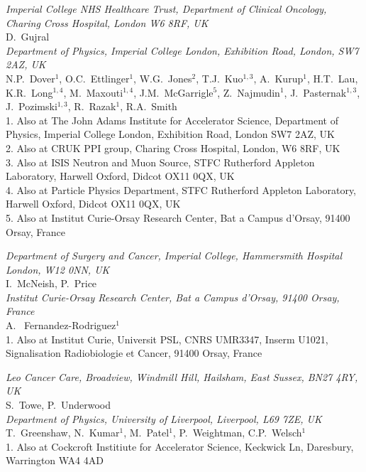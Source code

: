 \noindent \textit{Imperial College NHS Healthcare Trust, Department of Clinical Oncology, Charing Cross Hospital, London W6 8RF, UK} \\
D.~Gujral \\
 
\noindent \textit{Department of Physics, Imperial College London, Exhibition Road, London, SW7 2AZ, UK} \\
N.P.~Dover$^{1}$, O.C.~Ettlinger$^{1}$, W.G.~Jones$^{2}$, T.J.~Kuo$^{1, 3}$, A.~Kurup$^{1}$, H.T.~Lau, K.R.~Long$^{1, 4}$, M.~Maxouti$^{1, 4}$, J.M.~McGarrigle$^{5}$, Z.~Najmudin$^{1}$, J.~Pasternak$^{1, 3}$, J.~Pozimski$^{1, 3}$, R.~Razak$^{1}$, R.A.~Smith \\
{\footnotesize
  1. Also at The John Adams Institute for Accelerator Science, Department of Physics, Imperial College London, Exhibition Road, London SW7 2AZ, UK \\
  2. Also at CRUK PPI group, Charing Cross Hospital, London, W6 8RF, UK \\
  3. Also at ISIS Neutron and Muon Source, STFC Rutherford Appleton Laboratory, Harwell Oxford, Didcot OX11 0QX, UK \\
  4. Also at Particle Physics Department, STFC Rutherford Appleton Laboratory, Harwell Oxford, Didcot OX11 0QX, UK \\
  5. Also at Institut Curie-Orsay Research Center, Bat a Campus d'Orsay, 91400 Orsay, France \\
}
 
\noindent \textit{Department of Surgery and Cancer, Imperial College, Hammersmith Hospital London, W12 0NN, UK} \\
I.~McNeish, P.~Price \\
 
\noindent \textit{Institut Curie-Orsay Research Center, Bat a Campus d'Orsay, 91400 Orsay, France} \\
A. ~Fernandez-Rodriguez$^{1}$ \\
{\footnotesize
  1. Also at Institut Curie, Universit PSL, CNRS UMR3347, Inserm U1021, Signalisation Radiobiologie et Cancer, 91400 Orsay, France \\
}
 
\noindent \textit{Leo Cancer Care, Broadview, Windmill Hill, Hailsham, East Sussex, BN27 4RY, UK} \\
S.~Towe, P.~Underwood \\
 
\noindent \textit{Department of Physics, University of Liverpool, Liverpool, L69 7ZE, UK} \\
T.~Greenshaw, N.~Kumar$^{1}$, M.~Patel$^{1}$, P.~Weightman, C.P.~Welsch$^{1}$ \\
{\footnotesize
  1. Also at Cockcroft Institiute for Accelerator Science, Keckwick Ln, Daresbury, Warrington WA4 4AD \\
}
 
